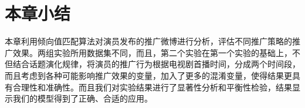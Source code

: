 \section{本章小结}

本章利用倾向值匹配算法对演员发布的推广微博进行分析，评估不同推广策略的推广效果。两组实验所用数据集不同，而且，第二个实验在第一个实验的基础上，不但结合话题演化规律，将演员的推广行为根据电视剧首播时间，分成两个时间段，而且考虑到各种可能影响推广效果的变量，加入了更多的混淆变量，使得结果更具有合理性和准确性。而且我们对实验结果进行了显著性分析和平衡性检验，结果显示我们的模型得到了正确、合适的应用。



































